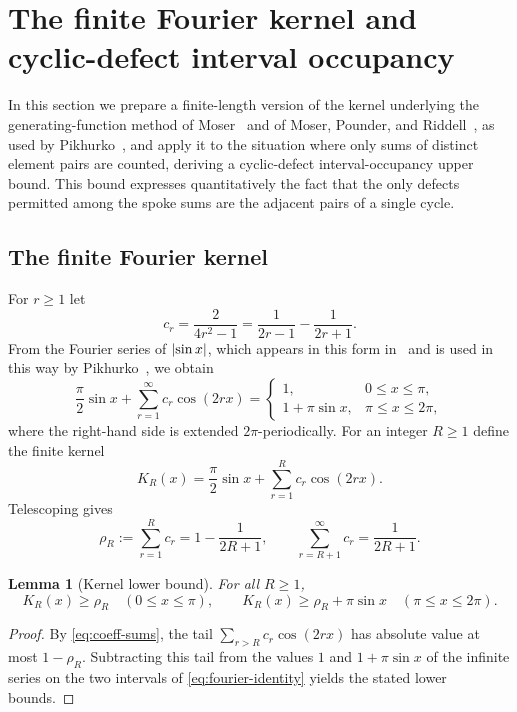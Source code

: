 \documentclass[11pt]{article}
\newtheorem{lemma}[theorem]{Lemma}
\theoremstyle{definition}
\theoremstyle{remark}
\numberwithin{equation}{section}
\DeclarePairedDelimiter{\abs}{\lvert}{\rvert}
\begin{document}
\section{The finite Fourier kernel and cyclic-defect interval occupancy}\label{sec:fourier}

In this section we prepare a finite-length version of the kernel underlying the generating-function method of Moser~\cite{Moser1960} and of Moser, Pounder, and Riddell~\cite[Lemma~1]{MoserPounderRiddell1969}, as used by Pikhurko~\cite[\S4]{Pikhurko2006}, and apply it to the situation where only sums of distinct element pairs are counted, deriving a cyclic-defect interval-occupancy upper bound. This bound expresses quantitatively the fact that the only defects permitted among the spoke sums are the adjacent pairs of a single cycle.

\subsection{The finite Fourier kernel}

For $r\ge1$ let
\[
  c_r=\frac{2}{4r^2-1}
  =\frac1{2r-1}-\frac1{2r+1}.
\]
From the Fourier series of $\abs{\sin x}$, which appears in this form in~\cite[p.~400]{MoserPounderRiddell1969} and is used in this way by Pikhurko~\cite[\S4]{Pikhurko2006}, we obtain
\begin{equation}\label{eq:fourier-identity}
  \frac\pi2\sin x+
  \sum_{r=1}^{\infty}c_r\cos(2rx)
  =
  \begin{cases}
    1,&0\le x\le\pi,\\
    1+\pi\sin x,&\pi\le x\le2\pi,
  \end{cases}
\end{equation}
where the right-hand side is extended $2\pi$-periodically. For an integer $R\ge1$ define the finite kernel
\[
  K_R(x)=\frac\pi2\sin x+\sum_{r=1}^{R}c_r\cos(2rx).
\]
Telescoping gives
\begin{equation}\label{eq:coeff-sums}
  \rho_R:=\sum_{r=1}^{R}c_r=1-\frac1{2R+1},
  \qquad
  \sum_{r=R+1}^{\infty}c_r=\frac1{2R+1}.
\end{equation}

\begin{lemma}[Kernel lower bound]\label{lem:kernel}
For all $R\ge1$,
\[
  K_R(x)\ge\rho_R\quad(0\le x\le\pi),
  \qquad
  K_R(x)\ge\rho_R+\pi\sin x\quad(\pi\le x\le2\pi).
\]
\end{lemma}

\begin{proof}
By \eqref{eq:coeff-sums}, the tail $\sum_{r>R}c_r\cos(2rx)$ has absolute value at most $1-\rho_R$. Subtracting this tail from the values $1$ and $1+\pi\sin x$ of the infinite series on the two intervals of \eqref{eq:fourier-identity} yields the stated lower bounds.
\end{proof}
\end{document}
